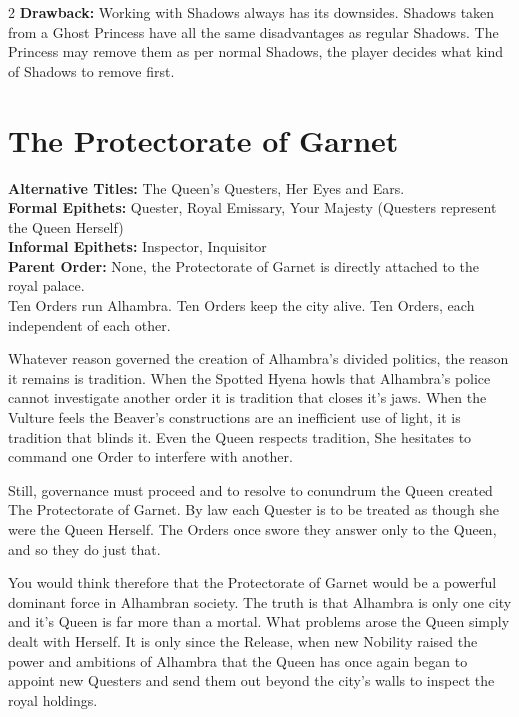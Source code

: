 \begin{multicols}{2}
\textbf{Drawback:} Working with Shadows always has its downsides. Shadows taken from a Ghost Princess have all the same disadvantages as regular Shadows. The Princess may remove them as per normal Shadows, the player decides what kind of Shadows to remove first.


\section*{The Protectorate of Garnet}
\label{sec:Garnet}

\noindent \textbf{Alternative Titles:} The Queen's Questers, Her Eyes and Ears.\\

\noindent \textbf{Formal Epithets:} Quester, Royal Emissary, Your Majesty (Questers represent the Queen Herself)\\

\noindent \textbf{Informal Epithets:} Inspector, Inquisitor \\

\noindent \textbf{Parent Order:} None, the Protectorate of Garnet is directly attached to the royal palace. \\

Ten Orders run Alhambra. Ten Orders keep the city alive. Ten Orders, each independent of each other. 

Whatever reason governed the creation of Alhambra's divided politics, the reason it remains is tradition. When the Spotted Hyena howls that Alhambra's police cannot investigate another order it is tradition that closes it's jaws. When the Vulture feels the Beaver's constructions are an inefficient use of light, it is tradition that blinds it. Even the Queen respects tradition, She hesitates to command one Order to interfere with another. 

Still, governance must proceed and to resolve to conundrum the Queen created The Protectorate of Garnet. By law each Quester is to be treated as though she were the Queen Herself. The Orders once swore they answer only to the Queen, and so they do just that. 

You would think therefore that the Protectorate of Garnet would be a powerful dominant force in Alhambran society. The truth is that Alhambra is only one city and it's Queen is far more than a mortal. What problems arose the Queen simply dealt with Herself. It is only since the Release, when new Nobility raised the power and ambitions of Alhambra that the Queen has once again began to appoint new Questers and send them out beyond the city's walls to inspect the royal holdings. 


\end{multicols}
